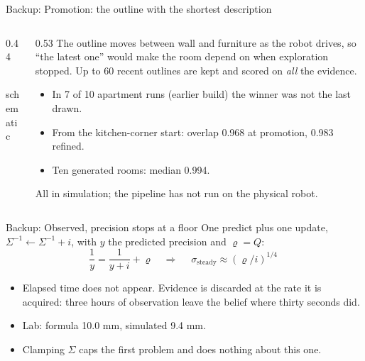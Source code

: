 \documentclass[10pt, aspectratio=169]{beamer}
\begin{document}
\begin{frame}{Backup: Promotion: the outline with the shortest description}
  \begin{columns}[c]
    \begin{column}{0.44\textwidth}
      \centering
      \\
      {\scriptsize schematic}
    \end{column}
    \begin{column}{0.53\textwidth}
      \small
      The outline moves between wall and furniture as the robot drives, so ``the latest one'' would
      make the room depend on when exploration stopped. Up to 60 recent outlines are kept and
      scored on \emph{all} the evidence.
      \begin{itemize}
        \item In 7 of 10 apartment runs (earlier build) the winner was not the last drawn.
        \item From the kitchen-corner start: overlap 0.968 at promotion, 0.983 refined.
        \item Ten generated rooms: median 0.994.
      \end{itemize}
      {\scriptsize All in simulation; the pipeline has not run on the physical robot.}
    \end{column}
  \end{columns}
\end{frame}

\begin{frame}{Backup: Observed, precision stops at a floor}
  One predict plus one update, $\Sigma^{-1}\leftarrow\Sigma^{-1}+i$, with $y$ the predicted precision and
  $\varrho=Q$:
  \[
    \frac1y=\frac1{y+i}+\varrho
    \quad\Longrightarrow\quad
    \boxed{\;\sigma_\text{steady}\approx(\varrho/i)^{1/4}\;}
  \]
  \begin{itemize}
    \item \alert{Elapsed time does not appear.} Evidence is discarded at the rate it is acquired:
          three hours of observation leave the belief where thirty seconds did.
    \item Lab: formula 10.0 mm, simulated 9.4 mm.
    \item Clamping $\Sigma$ caps the first problem and does nothing about this one.
  \end{itemize}
\end{frame}
\end{document}
